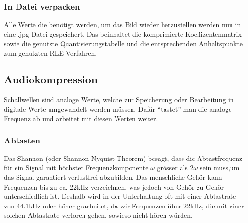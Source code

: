 \documentclass{article}
\begin{document}
\subsubsection{In Datei verpacken}
Alle Werte die benötigt werden, um das Bild wieder herzustellen werden nun in eine .jpg Datei gespeichert. Das beinhaltet die komprimierte Koeffizentenmatrix sowie die genutzte Quantisierungstabelle und die entsprechenden Anhaltspunkte zum genutzten RLE-Verfahren.

\subsection{Audiokompression}
Schallwellen sind analoge Werte, welche zur Speicherung oder Bearbeitung in digitale Werte umgewandelt werden müssen. Dafür ``tastet'' man die analoge Frequenz ab und arbeitet mit diesen Werten weiter.
\subsubsection{Abtasten}
Das Shannon (oder Shannon-Nyquist Theorem) besagt, dass die Abtastfrequenz für ein Signal mit höchster Frequenzkomponente $\omega$ grösser als $2\omega$ sein muss,um das Signal garantiert verlustfrei abzubilden. Das menschliche Gehör kann Frequenzen bis zu ca. 22kHz verzeichnen, was jedoch von Gehör zu Gehör unterschiedlich ist. Deshalb wird in der Unterhaltung oft mit einer Abtastrate von 44.1kHz oder höher gearbeitet, da wir Frequenzen über 22kHz, die mit einer solchen Abtastrate verloren gehen, sowieso nicht hören würden.
\end{document}
